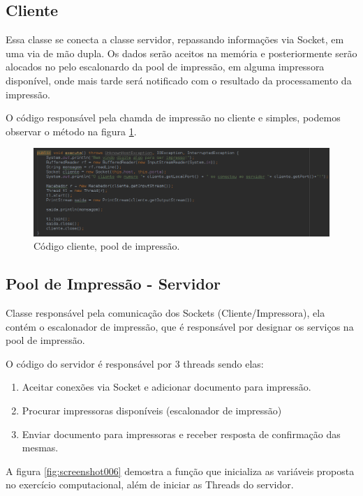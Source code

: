 \documentclass[12pt]{article}
\begin{document}
\subsection{Cliente}
	Essa classe  se conecta a classe servidor, repassando informações via Socket, em uma via de mão dupla.
	Os dados serão aceitos na memória e posteriormente serão alocados no pelo escalonardo da pool de impressão, em alguma impressora disponível, onde mais tarde será notificado com o resultado da processamento da impressão.
	
	O código responsável pela chamda de impressão no cliente e simples, podemos observar o método na figura  \ref{fig:screenshot005}.
\begin{figure}[H]
	\centering
	\includegraphics[width=1\linewidth]{imagens/screenshot005}
	\caption{Código cliente, pool de impressão.}
	\label{fig:screenshot005}
\end{figure}



\subsection{Pool de Impressão - Servidor}\label{pool}
  Classe responsável pela comunicação dos Sockets (Cliente/Impressora), ela contém o escalonador  de impressão, que  é responsável por designar os serviços na pool de impressão.
  
	  O código do servidor é responsável por 3 threads sendo elas:
	  \begin{enumerate}
	  	\item Aceitar conexões via Socket e adicionar documento para impressão.
	  	\item Procurar impressoras disponíveis (escalonador de impressão)
	  	\item Enviar documento para impressoras e receber resposta de confirmação das mesmas.
	  \end{enumerate}
	
	A figura \ref{fig:screenshot006} demostra a função que inicializa as variáveis proposta no exercício computacional, além de iniciar as Threads do servidor. 
\end{document}
